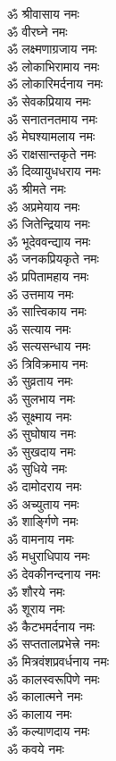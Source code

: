\begin{multicols}{2}
\begin{flushleft}
ॐ श्रीवासाय नमः\\
ॐ वीरघ्ने नमः\hfill{}\\
ॐ लक्ष्मणाग्रजाय नमः\\
ॐ लोकाभिरामाय नमः\\
ॐ लोकारिमर्दनाय नमः\\
ॐ सेवकप्रियाय नमः\\
ॐ सनातनतमाय नमः\\
ॐ मेघश्यामलाय नमः\\
ॐ राक्षसान्तकृते नमः\\
ॐ दिव्यायुधधराय नमः\\
ॐ श्रीमते नमः\\
ॐ अप्रमेयाय नमः\hfill{}\\
ॐ जितेन्द्रियाय नमः\\
ॐ भूदेववन्द्याय नमः\\
ॐ जनकप्रियकृते नमः\\
ॐ प्रपितामहाय नमः\\
ॐ उत्तमाय नमः\\
ॐ सात्त्विकाय नमः\\
ॐ सत्याय नमः\\
ॐ सत्यसन्धाय नमः\\
ॐ त्रिविक्रमाय नमः\\
ॐ सुव्रताय नमः\hfill{}\\
ॐ सुलभाय नमः\\
ॐ सूक्ष्माय नमः\\
ॐ सुघोषाय नमः\\
ॐ सुखदाय नमः\\
ॐ सुधिये नमः\\
ॐ दामोदराय नमः\\
ॐ अच्युताय नमः\\
ॐ शार्ङ्गिणे नमः\\
ॐ वामनाय नमः\\
ॐ मधुराधिपाय नमः\hfill{}\\
ॐ देवकीनन्दनाय नमः\\
ॐ शौरये नमः\\
ॐ शूराय नमः\\
ॐ कैटभमर्दनाय नमः\\
ॐ सप्ततालप्रभेत्त्रे नमः\\
ॐ मित्रवंशप्रवर्धनाय नमः\\
ॐ कालस्वरूपिणे नमः\\
ॐ कालात्मने नमः\\
ॐ कालाय नमः\\
ॐ कल्याणदाय नमः\hfill{}\\
ॐ कवये नमः\\

\end{flushleft}
\end{multicols}
